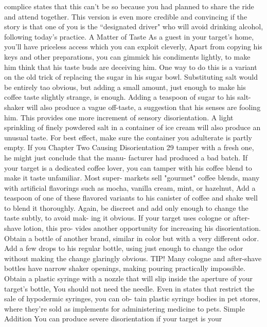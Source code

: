 \documentclass{book}
\begin{document}
complice states that this can't be so because you had planned to 
share the ride and attend together. This version is even more 
credible and convincing if the story is that one of you is the 
“designated driver" who will avoid drinking alcohol, following 
today's practice. 
A Matter of Taste 
As a guest in your target's home, you'll have priceless access 
which you can exploit cleverly, Apart from copying his keys 
and other preparations, you can gimmick his condiments 
lightly, to make him think that his taste buds are deceiving him. 
One way to do this is a variant on the old trick of replacing the 
sugar in his sugar bowl. Substituting salt would be entirely tao 
obvious, but adding a small amount, just enough to make his 
coffee taste slightly strange, is enough. Adding a teaspoon of 
sugar to his salt-shaker will also produce a vague off-taste, a 
suggestion that his senses are fooling him. This provides one 
more increment of sensory disorientation. 
A light sprinkling of finely powdered salt in a container of 
ice cream will also produce an unusual taste. For best effect, 
make sure the container you adulterate is partly empty. If you 
Chapter Two 
Causing Disorientation 
29 
tamper with a fresh one, he might just conclude that the manu- 
facturer had produced a bad batch. 
If your target is a dedicated coffee lover, you can tamper 
with his coffee blend to make it taste unfamiliar. Most super- 
markets sell "gourmet" coffee blends, many with artificial 
flavorings such as mocha, vanilla cream, mint, or hazelnut, Add 
a teaspoon of one of these flavored variants to his canister of 
coffee and shake well to blend it thoroughly. Again, be discreet 
and add only enough to change the taste subtly, to avoid mak- 
ing it obvious. 
If your target uses cologne or after-shave lotion, this pro- 
vides another opportunity for increasing his disorientation. 
Obtain a bottle of another brand, similar in color but with a 
very different odor. Add a few drops to his regular bottle, using 
just enough to change the odor without making the change 
glaringly obvious. 
TIP! Many cologne and after-shave bottles have narrow 
shaker openings, making pouring practically impossible. Obtain 
a plastic syringe with a nozzle that will slip inside the aperture 
of your target's bottle, You should not need the needle. Even in 
states that restrict the sale of hypodermic syringes, you can ob- 
tain plastic syringe bodies in pet stores, where they're sold as 
implements for administering medicine to pets. 
Simple Addition 
You can produce severe disorientation if your target is your 
\end{document}
